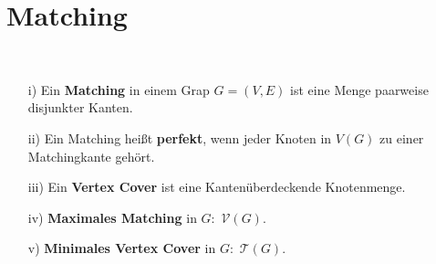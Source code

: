 \section{Matching}
\begin{definition}[Matching]~
	\begin{itemize}
		\item[i)] Ein \textbf{Matching} in einem Grap $G=(V,E)$ ist eine Menge paarweise disjunkter Kanten.
		\item[ii)] Ein Matching heißt \textbf{perfekt}, wenn jeder Knoten in $V(G)$ zu einer Matchingkante gehört.
		\item[iii)] Ein \textbf{Vertex Cover} ist eine Kantenüberdeckende Knotenmenge.
		\item[iv)] \textbf{Maximales Matching} in $G:$ $\mathcal{V}(G)$.
		\item[v)] \textbf{Minimales Vertex Cover} in $G:$ $\mathcal{T}(G)$.
	\end{itemize}
\end{definition}
